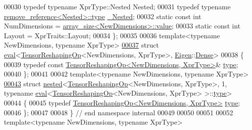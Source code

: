 \begin{DoxyCode}
00030   \textcolor{keyword}{typedef} \textcolor{keyword}{typename} XprType::Nested Nested;
00031   \textcolor{keyword}{typedef} \textcolor{keyword}{typename} \hyperlink{group___sparse_core___module}{remove\_reference<Nested>::type} 
      \hyperlink{group___sparse_core___module}{\_Nested};
00032   \textcolor{keyword}{static} \textcolor{keyword}{const} \textcolor{keywordtype}{int} NumDimensions = \hyperlink{struct_eigen_1_1internal_1_1array__size}{array\_size<NewDimensions>::value};
00033   \textcolor{keyword}{static} \textcolor{keyword}{const} \textcolor{keywordtype}{int} Layout = XprTraits::Layout;
00034 \};
00035 
00036 \textcolor{keyword}{template}<\textcolor{keyword}{typename} NewDimensions, \textcolor{keyword}{typename} XprType>
\hyperlink{struct_eigen_1_1internal_1_1eval_3_01_tensor_reshaping_op_3_01_new_dimensions_00_01_xpr_type_01_4_00_01_eigen_1_1_dense_01_4}{00037} \textcolor{keyword}{struct }\hyperlink{struct_eigen_1_1internal_1_1eval}{eval}<\hyperlink{class_eigen_1_1_tensor_reshaping_op}{TensorReshapingOp}<NewDimensions, XprType>, 
      \hyperlink{namespace_eigen}{Eigen}::\hyperlink{struct_eigen_1_1_dense}{Dense}>
00038 \{
00039   \textcolor{keyword}{typedef} \textcolor{keyword}{const} \hyperlink{class_eigen_1_1_tensor_reshaping_op}{TensorReshapingOp<NewDimensions, XprType>}& 
      \hyperlink{class_eigen_1_1_tensor_reshaping_op}{type};
00040 \};
00041 
00042 \textcolor{keyword}{template}<\textcolor{keyword}{typename} NewDimensions, \textcolor{keyword}{typename} XprType>
\hyperlink{struct_eigen_1_1internal_1_1nested_3_01_tensor_reshaping_op_3_01_new_dimensions_00_01_xpr_type_0f8fc83361856d40739eb02dd0bb3ea94}{00043} \textcolor{keyword}{struct }\hyperlink{struct_eigen_1_1internal_1_1nested}{nested}<\hyperlink{class_eigen_1_1_tensor_reshaping_op}{TensorReshapingOp}<NewDimensions, XprType>, 1, typename 
      \hyperlink{struct_eigen_1_1internal_1_1eval}{eval}<\hyperlink{class_eigen_1_1_tensor_reshaping_op}{TensorReshapingOp}<NewDimensions, XprType> >::\hyperlink{class_eigen_1_1_tensor_reshaping_op}{type}>
00044 \{
00045   \textcolor{keyword}{typedef} \hyperlink{class_eigen_1_1_tensor_reshaping_op}{TensorReshapingOp<NewDimensions, XprType>} 
      \hyperlink{class_eigen_1_1_tensor_reshaping_op}{type};
00046 \};
00047 
00048 \}  \textcolor{comment}{// end namespace internal}
00049 
00050 
00051 
00052 \textcolor{keyword}{template}<\textcolor{keyword}{typename} NewDimensions, \textcolor{keyword}{typename} XprType>

\end{DoxyCode}
